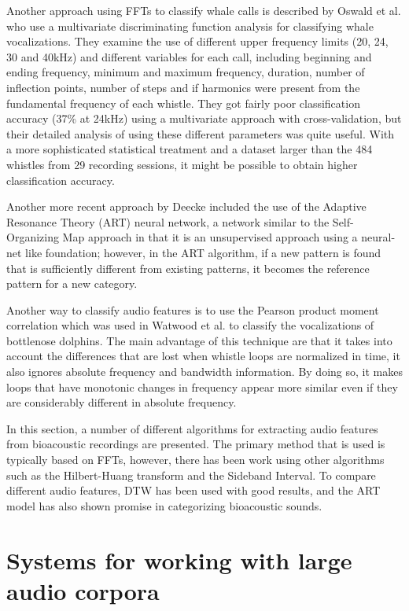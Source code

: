 Another approach using FFTs to classify whale calls is described by
Oswald et al. \cite{oswald2003acoustic} who use a multivariate
discriminating function analysis for classifying whale vocalizations.
They examine the use of different upper frequency limits (20, 24, 30
and 40kHz) and different variables for each call, including beginning
and ending frequency, minimum and maximum frequency, duration, number
of inflection points, number of steps and if harmonics were present
from the fundamental frequency of each whistle.  They got fairly poor
classification accuracy (37\% at 24kHz) using a multivariate approach
with cross-validation, but their detailed analysis of using these
different parameters was quite useful.  With a more sophisticated
statistical treatment and a dataset larger than the 484 whistles from
29 recording sessions, it might be possible to obtain higher
classification accuracy.

Another more recent approach by Deecke \cite{deecke2006playback} included the
use of the Adaptive Resonance Theory (ART) neural network, a network
similar to the Self-Organizing Map approach in that it is an
unsupervised approach using a neural-net like foundation; however, in
the ART algorithm, if a new pattern is found that is sufficiently
different from existing patterns, it becomes the reference pattern for
a new category.

Another way to classify audio features is to use the Pearson product
moment correlation which was used in Watwood et
al. \cite{watwood2004whistle} to classify the vocalizations of
bottlenose dolphins.  The main advantage of this technique are that it
takes into account the differences that are lost when whistle loops
are normalized in time, it also ignores absolute frequency and
bandwidth information.  By doing so, it makes loops that have
monotonic changes in frequency appear more similar even if they are
considerably different in absolute frequency.

In this section, a number of different algorithms for extracting audio
features from bioacoustic recordings are presented.  The primary
method that is used is typically based on FFTs, however, there has
been work using other algorithms such as the Hilbert-Huang transform
and the Sideband Interval.  To compare different audio features, DTW
has been used with good results, and the ART model has also shown
promise in categorizing bioacoustic sounds.

\section{Systems for working with large audio corpora}
\label{section:relatedWork:systems}

